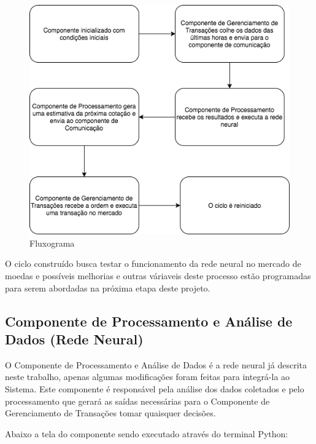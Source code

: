 \begin{figure}[h]
	\centering
	\includegraphics[keepaspectratio=true,scale=0.8]{figuras/comp.png}
	\caption{Fluxograma }
	\label{fig12}
\end{figure}

O ciclo construído busca testar o funcionamento da rede neural no mercado de moedas e possíveis melhorias e outras váriaveis deste processo estão programadas para serem abordadas na próxima etapa deste projeto.

\pagebreak

\subsection[Componente de Processamento e Análise de Dados (Rede Neural)]{Componente de Processamento e Análise de Dados (Rede Neural)}

O Componente de Processamento e Análise de Dados é a rede neural já descrita neste trabalho, apenas algumas modificações foram feitas para integrá-la ao Sistema.
Este componente é responsável pela análise dos dados coletados e pelo processamento que gerará as saídas necessárias para o Componente de Gerenciamento de Transações tomar quaisquer decisões.

Abaixo a tela do componente sendo executado através do terminal Python:

